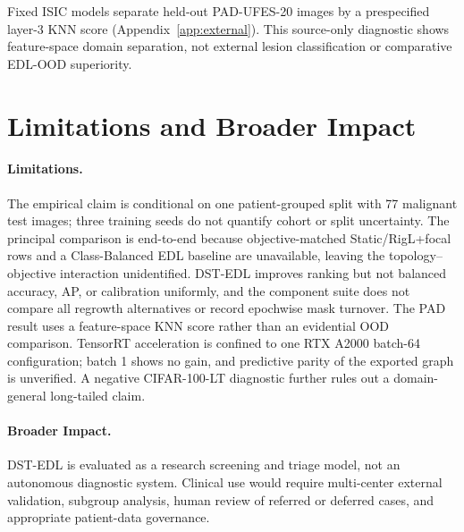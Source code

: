 \documentclass[letterpaper]{article}
\begin{document}
Fixed ISIC models separate held-out PAD-UFES-20 images by a prespecified layer-3 KNN score (Appendix~\ref{app:external}). This source-only diagnostic shows feature-space domain separation, not external lesion classification or comparative EDL-OOD superiority.

\section{Limitations and Broader Impact}\label{sec:limitations}
\paragraph{Limitations.} The empirical claim is conditional on one patient-grouped split with 77 malignant test images; three training seeds do not quantify cohort or split uncertainty. The principal comparison is end-to-end because objective-matched Static/RigL+focal rows and a Class-Balanced EDL baseline are unavailable, leaving the topology--objective interaction unidentified. DST-EDL improves ranking but not balanced accuracy, AP, or calibration uniformly, and the component suite does not compare all regrowth alternatives or record epochwise mask turnover. The PAD result uses a feature-space KNN score rather than an evidential OOD comparison. TensorRT acceleration is confined to one RTX A2000 batch-64 configuration; batch 1 shows no gain, and predictive parity of the exported graph is unverified. A negative CIFAR-100-LT diagnostic further rules out a domain-general long-tailed claim.

\paragraph{Broader Impact.} DST-EDL is evaluated as a research screening and triage model, not an autonomous diagnostic system. Clinical use would require multi-center external validation, subgroup analysis, human review of referred or deferred cases, and appropriate patient-data governance.
\end{document}

